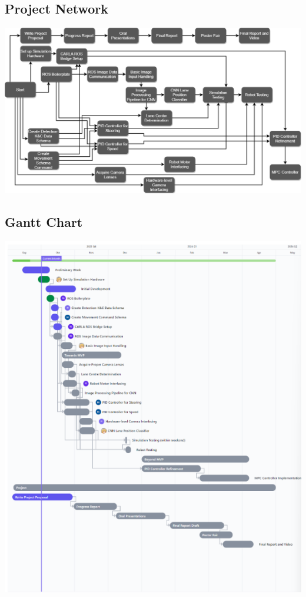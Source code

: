 \documentclass[titlepage]{article}
\begin{document}
\subsection{Project Network}
\includegraphics{activity.png}
\subsection{Gantt Chart}
\includegraphics{gantt.PNG}
\end{document}
